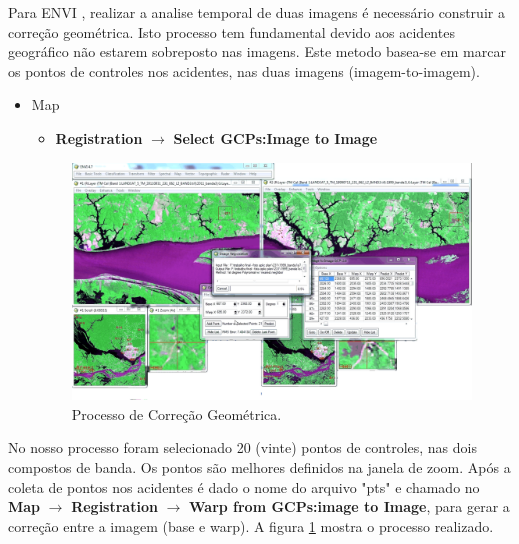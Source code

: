 \hspace{1.5cm}
Para ENVI \cite{envi}, realizar a analise temporal de duas imagens é necessário construir a correção geométrica. Isto processo tem fundamental devido aos acidentes geográfico não estarem sobreposto nas imagens. Este metodo basea-se em marcar os pontos de controles nos acidentes, nas duas imagens (imagem-to-imagem).\\

\begin{itemize}
\item Map
\begin{itemize}
\item \textbf{Registration} $\rightarrow$ \textbf{Select GCPs:Image to Image}
\end{itemize}
\begin{figure}[!htpb]
        \centering
        \includegraphics[scale =0.2]{imagens/correcao04a.png}
        \caption{Processo de Correção Geométrica.}
        \label{correcao04}
\end{figure}
\end{itemize}
\hspace{1.5cm}
No nosso processo foram selecionado 20 (vinte) pontos de controles, nas dois compostos de banda. Os pontos são melhores definidos na janela de zoom. Após a coleta de pontos nos acidentes é dado o nome do arquivo "pts" e chamado no \textbf{Map} $\rightarrow$ \textbf{Registration} $\rightarrow$ \textbf{Warp from GCPs:image to Image}, para gerar a correção entre a imagem (base e warp). A figura \ref{correcao04} mostra o processo realizado.

